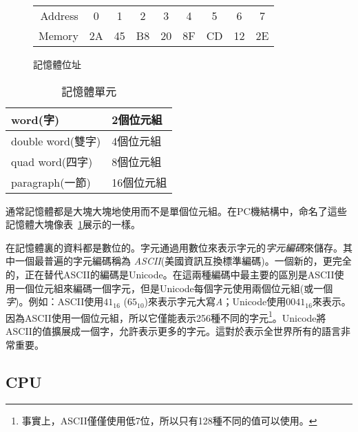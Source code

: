\begin{figure}[ht]
\begin{center}
\begin{tabular}{rcccccccc}
Address & 0 & 1 & 2 & 3 & 4 & 5 & 6 & 7 \\
\cline{2-9}
Memory & \multicolumn{1}{|c}{2A}  & \multicolumn{1}{|c}{45}
       & \multicolumn{1}{|c}{B8} & \multicolumn{1}{|c}{20}
       & \multicolumn{1}{|c}{8F} & \multicolumn{1}{|c}{CD}
       & \multicolumn{1}{|c}{12} & \multicolumn{1}{|c|}{2E} \\
\cline{2-9}
\end{tabular}
\caption{ 記憶體位址 \label{fig:memory} }
\end{center}
\end{figure}

\begin{table}
\begin{center}
\begin{tabular}{|l|l|}\hline
word(字) & 2個位元組 \\ \hline
double word(雙字) & 4個位元組 \\ \hline
quad word(四字) & 8個位元組 \\ \hline
paragraph(一節) & 16個位元組 \\ \hline
\end{tabular}
\caption{ 記憶體單元 \label{tab:mem_units} }
\end{center}
\end{table}

通常記憶體都是大塊大塊地使用而不是單個位元組。在PC機結構中，命名了這些記憶體大塊像表~\ref{tab:mem_units}展示的一樣。

在記憶體裏的資料都是數位的。字元通過用數位來表示字元的\emph{字元編碼}來儲存。其中一個最普遍的字元編碼稱為
\emph{ASCII}(美國資訊互換標準編碼)。一個新的，更完全的，正在替代ASCII的編碼是Unicode。在這兩種編碼中最主要的區別是ASCII使用一個位元組來編碼一個字元，但是Unicode每個字元使用兩個位元組(或一個
\emph{字})。例如：ASCII使用$41_{16}$
($65_{10}$)來表示字元大寫\emph{A}；Unicode使用$0041_{16}$來表示。因為ASCII使用一個位元組，所以它僅能表示256種不同的字元\footnote{事實上，ASCII僅僅使用低7位，所以只有128種不同的值可以使用。}。Unicode將ASCII的值擴展成一個字，允許表示更多的字元。這對於表示全世界所有的語言非常重要。

\subsection{CPU}

